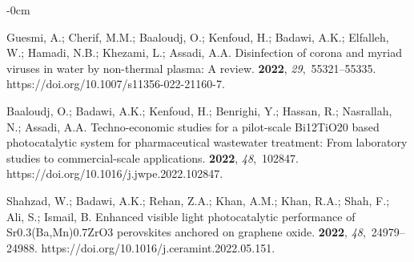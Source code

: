 \documentclass[gels,article,accept,pdftex,moreauthors]{Definitions/mdpi}
\begin{document}
\begin{adjustwidth}{-\extralength}{0cm}



%
\begin{thebibliography}{999}

Guesmi, A.; Cherif, M.M.; Baaloudj, O.; Kenfoud, H.; Badawi, A.K.; Elfalleh,
  W.; Hamadi, N.B.; Khezami, L.; Assadi, A.A.
\newblock Disinfection of corona and myriad viruses in water by non-thermal
  plasma: A review.
 {\bf 2022}, {\em 29},~55321--55335.
\newblock
  https://doi.org/10.1007/s11356-022-21160-7.%

Baaloudj, O.; Badawi, A.K.; Kenfoud, H.; Benrighi, Y.; Hassan, R.; Nasrallah,
  N.; Assadi, A.A.
\newblock Techno-economic studies for a pilot-scale Bi12TiO20 based
  photocatalytic system for pharmaceutical wastewater treatment: From
  laboratory studies to commercial-scale applications.
 {\bf 2022}, {\em
  48},~102847.
\newblock
  https://doi.org/10.1016/j.jwpe.2022.102847.%

Shahzad, W.; Badawi, A.K.; Rehan, Z.A.; Khan, A.M.; Khan, R.A.; Shah, F.; Ali,
  S.; Ismail, B.
\newblock Enhanced visible light photocatalytic performance of
  Sr0.3(Ba,Mn)0.7ZrO3 perovskites anchored on graphene oxide.
 {\bf 2022}, {\em 48},~24979--24988.
\newblock
  https://doi.org/10.1016/j.ceramint.2022.05.151.%


\end{thebibliography}
\end{adjustwidth}
\end{document}
